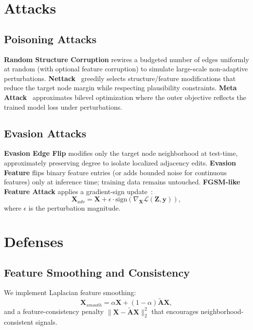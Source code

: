 \documentclass[conference]{IEEEtran}
\begin{document}
\section{Attacks}
\subsection{Poisoning Attacks}
\textbf{Random Structure Corruption} rewires a budgeted number of edges uniformly at random (with optional feature corruption) to simulate large-scale non-adaptive perturbations.
\textbf{Nettack}~\cite{zugner2018nettack} greedily selects structure/feature modifications that reduce the target node margin while respecting plausibility constraints.
\textbf{Meta Attack}~\cite{zugner2019metattack} approximates bilevel optimization where the outer objective reflects the trained model loss under perturbations.

\subsection{Evasion Attacks}
\textbf{Evasion Edge Flip} modifies only the target node neighborhood at test-time, approximately preserving degree to isolate localized adjacency edits.
\textbf{Evasion Feature} flips binary feature entries (or adds bounded noise for continuous features) only at inference time; training data remains untouched.
\textbf{FGSM-like Feature Attack} applies a gradient-sign update~\cite{goodfellow2015fgsm}:
\begin{equation}
\mathbf{X}_{adv} = \mathbf{X} + \epsilon\cdot \mathrm{sign}(\nabla_{\mathbf{X}}\mathcal{L}(\mathbf{Z},\mathbf{y})),
\end{equation}
where $\epsilon$ is the perturbation magnitude.

\section{Defenses}
\subsection{Feature Smoothing and Consistency}
We implement Laplacian feature smoothing:
\begin{equation}
\mathbf{X}_{smooth} = \alpha\mathbf{X} + (1-\alpha)\tilde{\mathbf{A}}\mathbf{X},
\end{equation}
and a feature-consistency penalty $\|\mathbf{X}-\tilde{\mathbf{A}}\mathbf{X}\|_2^2$ that encourages neighborhood-consistent signals.
\end{document}
